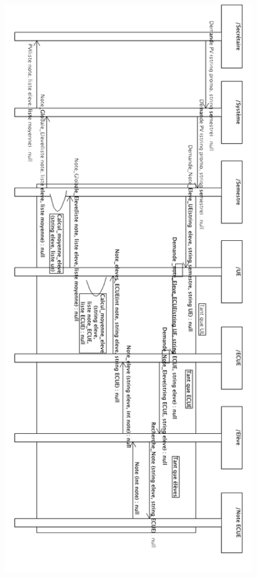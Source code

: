 \documentclass[letter, 11pt] {article}
\begin{document}
		\begin{figure}[htbp]
				\includegraphics[scale = 0.4]{../Diagrammes_sequence/Diagramme_sequence_demande_PV.png}
		\end{figure}
		
\end{document}
